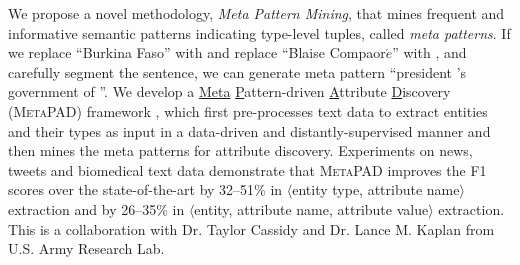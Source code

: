 \documentclass[10.5pt]{article}
\newcommand{\lb}{\mbox{$\langle$}}
\newcommand{\rb}{\mbox{$\rangle$}}
\newcommand{\pair}[2]{{\lb#1, #2\rb}\xspace}
\newcommand{\tuple}[3]{{\lb#1, #2, #3\rb}\xspace}
\begin{document}
We propose a novel methodology, \textit{Meta Pattern Mining}, that mines frequent and informative semantic patterns indicating type-level tuples, called \textit{meta patterns}. If we replace ``Burkina Faso'' with \cscountry and replace ``Blaise Compaor$\acute{e}$'' with \cspolitician, and carefully segment the sentence, we can generate meta pattern ``president \cspolitician's government of \cscountry''.
We develop a \underline{Meta} \underline{P}attern-driven \underline{A}ttribute \underline{D}iscovery (\textsc{MetaPAD}) framework \cite{jiang2016metapad}, which first pre-processes text data to extract entities and their types as input in a data-driven and distantly-supervised manner and then mines the meta patterns for attribute discovery. Experiments on news, tweets and biomedical text data demonstrate that \textsc{MetaPAD} improves the F1 scores over the state-of-the-art by 32--51\% in \pair{entity type}{attribute name} extraction and by 26--35\% in \tuple{entity}{attribute name}{attribute value} extraction. This is a collaboration with Dr. Taylor Cassidy and Dr. Lance M. Kaplan from U.S. Army Research Lab.


\vskip 0.03in
\vskip 0.01in


\end{document}
